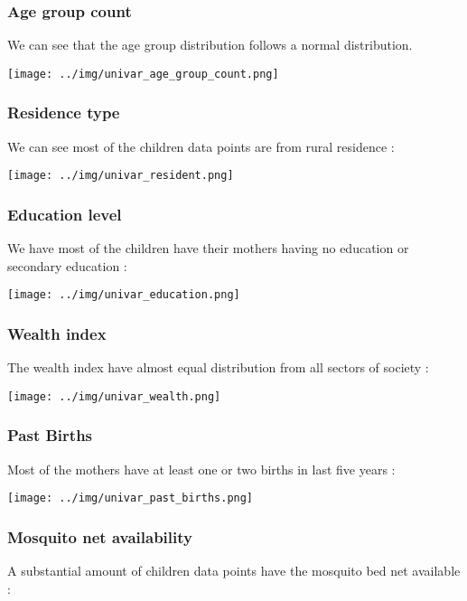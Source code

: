 \subsubsection{Age group count}
We can see that the age group distribution follows a normal distribution.

\texttt{[image: ../img/univar\_age\_group\_count.png]}

\clearpage

\subsubsection{Residence type}

We can see most of the children data points are from rural residence :

\texttt{[image: ../img/univar\_resident.png]}


\subsubsection{Education level}

We have most of the children have their mothers having no education or secondary education :

\texttt{[image: ../img/univar\_education.png]}


\subsubsection{Wealth index}
The wealth index have almost equal distribution from all sectors of society :

\texttt{[image: ../img/univar\_wealth.png]}


\subsubsection{Past Births}

Most of the mothers have at least one or two births in last five years :

\texttt{[image: ../img/univar\_past\_births.png]}



\subsubsection{Mosquito net availability}

A substantial amount of children data points have the mosquito bed net available :

